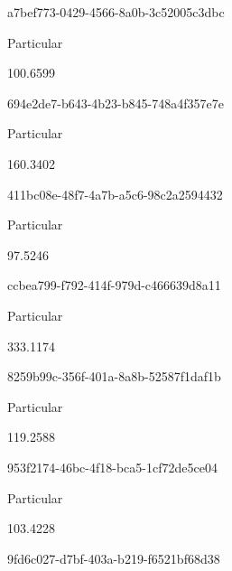 \documentclass[
  11pt,
  a4paper,
  DIV=11,
  numbers=noendperiod]{scrartcl}
\begin{document}
a7bef773-0429-4566-8a0b-3c52005c3dbc

\n      

Particular

\n      

100.6599

\n    

\n    

\n      

694e2de7-b643-4b23-b845-748a4f357e7e

\n      

Particular

\n      

160.3402

\n    

\n    

\n      

411bc08e-48f7-4a7b-a5c6-98c2a2594432

\n      

Particular

\n      

97.5246

\n    

\n    

\n      

ccbea799-f792-414f-979d-c466639d8a11

\n      

Particular

\n      

333.1174

\n    

\n    

\n      

8259b99c-356f-401a-8a8b-52587f1daf1b

\n      

Particular

\n      

119.2588

\n    

\n    

\n      

953f2174-46bc-4f18-bca5-1cf72de5ce04

\n      

Particular

\n      

103.4228

\n    

\n    

\n      

9fd6c027-d7bf-403a-b219-f6521bf68d38
\end{document}
